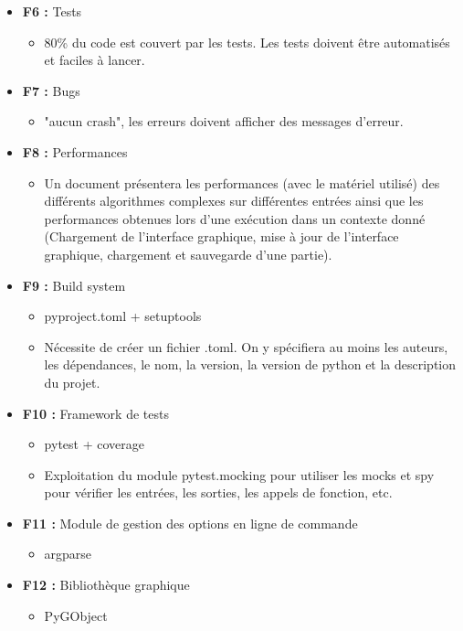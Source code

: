 \documentclass{article}
\begin{document}
\begin{itemize}
\begin{itemize}
        \item Des commentaires dans le code source aideront à la compréhension et la maintenabilité du programme.
    \end{itemize}
    \item \textbf{F6 :} Tests
    \begin{itemize}
        \item 80\% du code est couvert par les tests. Les tests doivent être automatisés et faciles à lancer.
    \end{itemize}
    \item \textbf{F7 :} Bugs
    \begin{itemize}
        \item "aucun crash", les erreurs doivent afficher des messages d’erreur.
    \end{itemize}
    \item \textbf{F8 :} Performances
    \begin{itemize}
        \item Un document présentera les performances (avec le matériel utilisé) des différents algorithmes complexes sur différentes entrées ainsi que les performances obtenues lors d'une exécution dans un contexte donné (Chargement de l'interface graphique, mise à jour de l'interface graphique, chargement et sauvegarde d'une partie).
    \end{itemize}
    \item \textbf{F9 :} Build system
    \begin{itemize}
        \item pyproject.toml + setuptools
        \item Nécessite de créer un fichier .toml. On y spécifiera au moins les auteurs, les dépendances, le nom, la version, la version de python et la description du projet.
    \end{itemize}
    \item \textbf{F10 :} Framework de tests
    \begin{itemize}
        \item pytest + coverage
        \item Exploitation du module pytest.mocking pour utiliser les mocks et spy pour vérifier les entrées, les sorties, les appels de fonction, etc.
    \end{itemize}
    \item \textbf{F11 :} Module de gestion des options en ligne de commande
    \begin{itemize}
        \item argparse
    \end{itemize}
    \item \textbf{F12 :} Bibliothèque graphique
    \begin{itemize}
        \item PyGObject
    \end{itemize}
\end{itemize}
\end{document}

